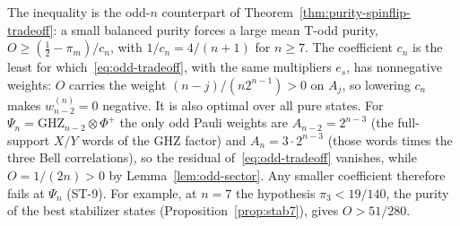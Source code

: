 \begin{remark}[interpretation]
The inequality is the odd-$n$ counterpart of
Theorem~\ref{thm:purity-spinflip-tradeoff}: a small balanced purity forces a large mean T-odd purity, $O\ge(\tfrac12-\pi_m)/c_n$, with $1/c_n=4/(n+1)$ for $n\ge7$.
The coefficient $c_n$ is the least for which~\eqref{eq:odd-tradeoff}, with the same multipliers $e_s$, has nonnegative weights:
$O$ carries the weight $(n-j)/(n2^{n-1})>0$ on $A_j$, so lowering $c_n$ makes $w_{n-2}^{(n)}=0$ negative. It is also optimal over all pure states. For
$\Psi_n=\mathrm{GHZ}_{n-2}\otimes\Phi^+$ the only odd Pauli weights are $A_{n-2}=2^{n-3}$ (the full-support $X/Y$ words of
the GHZ factor) and $A_n=3\cdot2^{n-3}$ (those words times the three Bell correlations), so the residual
of~\eqref{eq:odd-tradeoff} vanishes, while $O=1/(2n)>0$ by Lemma~\ref{lem:odd-sector}. Any smaller coefficient therefore
fails at $\Psi_n$ (ST-9).
For example, at $n=7$ the hypothesis $\pi_3<19/140$, the purity of the best stabilizer states (Proposition~\ref{prop:stab7}), gives
$O>51/280$.
\end{remark}

